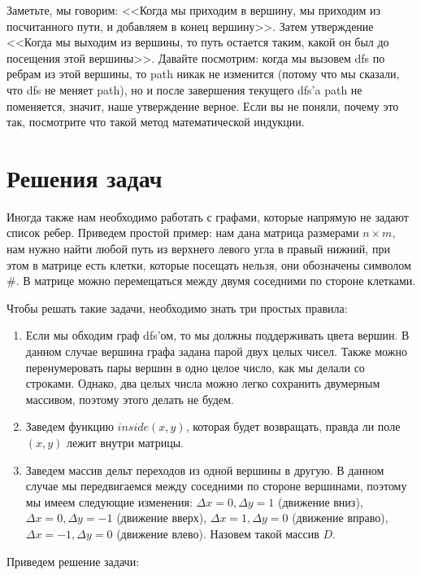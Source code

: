 \documentclass{article}
\begin{document}
Заметьте, мы говорим: <<Когда мы приходим в вершину, мы приходим из посчитанного пути, и добавляем в конец вершину>>. Затем утверждение <<Когда мы выходим из вершины, то путь остается таким, какой он был до посещения этой вершины>>. Давайте посмотрим: когда мы вызовем dfs по ребрам из этой вершины, то path никак не изменится (потому что мы сказали, что dfs не меняет path), но и после завершения текущего dfs'a path не поменяется, значит, наше утверждение верное. Если вы не поняли, почему это так, посмотрите что такой метод математической индукции.

\section{Решения задач}

Иногда также нам необходимо работать с графами, которые напрямую не задают список ребер. Приведем простой пример: нам дана матрица размерами $n \times m$, нам нужно найти любой путь из верхнего левого угла в правый нижний, при этом в матрице есть клетки, которые посещать нельзя, они обозначены символом \#. В матрице можно перемещаться между двумя соседними по стороне клетками.

Чтобы решать такие задачи, необходимо знать три простых правила:

\begin{enumerate}
    \item Если мы обходим граф dfs'ом, то мы должны поддерживать цвета вершин. В данном случае вершина графа задана парой двух целых чисел. Также можно перенумеровать пары вершин в одно целое число, как мы делали со строками. Однако, два целых числа можно легко сохранить двумерным массивом, поэтому этого делать не будем.
    \item Заведем функцию $inside(x,y)$, которая будет возвращать, правда ли поле $(x,y)$ лежит внутри матрицы.
    \item Заведем массив дельт переходов из одной вершины в другую. В данном случае мы передвигаемся между соседними по стороне вершинами, поэтому мы имеем следующие изменения: $\Delta x = 0, \Delta y = 1$ (движение вниз), $\Delta x = 0, \Delta y = -1$ (движение вверх), $\Delta x = 1, \Delta y = 0$ (движение вправо), $\Delta x = -1, \Delta y = 0$ (движение влево). Назовем такой массив $D$.
\end{enumerate}

Приведем решение задачи: 
\end{document}

